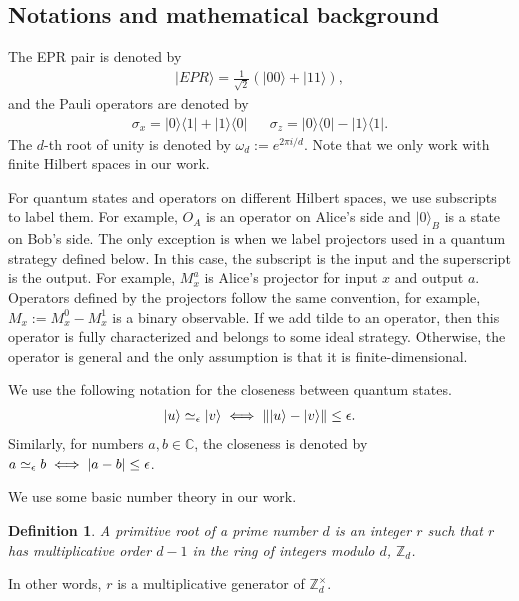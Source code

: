 \documentclass[11pt,letterpaper]{article}
\newcommand{\ket}[1]{|#1\rangle}
\newcommand{\ketbra}[2]{|#1\rangle\langle#2|}
\DeclarePairedDelimiter{\norm}{\lVert}{\rVert}
\DeclarePairedDelimiter{\cnorm}{\lvert}{\rvert}
\newcommand{\C}{\mathbb{C}}
\newcommand{\Z}{\mathbb{Z}}
\newcommand{\Zd}{\Z_d^{\times}}
\newcommand{\1}{\mathbb{1}}
\newcommand{\EPR}[1]{\Sigma^{(#1)}}
\newcommand{\paulix}{\sigma_x}
\newcommand{\pauliz}{\sigma_z}
\newcommand{\appd}[1]{\simeq_{#1}}
\newtheorem{definition}[theorem]{Definition}
\theoremstyle{definition}
\begin{document}
\subsection{Notations and mathematical background}


The EPR pair is denoted by 
\begin{align}
	\ket{EPR} = \frac{1}{\sqrt{2}}(\ket{00} + \ket{11}),
\end{align}
and the Pauli operators are denoted by
\begin{align}
	\paulix = \ketbra{0}{1}+\ketbra{1}{0} && \pauliz = \ketbra{0}{0} - \ketbra{1}{1}.
\end{align}
The $d$-th root of unity is denoted by $\omega_d:=e^{2\pi i/d}$. 
Note that we only work with finite Hilbert spaces in our work.

For quantum states and operators on different Hilbert spaces, we use subscripts to label them.
For example, $O_A$ is an operator on Alice's side and $\ket{0}_{B}$ is a state on Bob's side. 
The only exception is when we label projectors used in a quantum strategy defined below. In this case, the subscript 
is the input and the superscript is the output. For example, $M_x^a$ is Alice's projector for input $x$ and output $a$.
Operators defined by the projectors follow the same convention, for example, $M_x := M_x^0 - M_x^1$ is 
a binary observable.
If we add tilde to an operator, then this operator is fully characterized and belongs to some ideal strategy.
Otherwise, the operator is general and the only assumption is that it is finite-dimensional.

We use the following notation for the closeness between quantum states.
\begin{align}
	\ket{u} \appd{\epsilon} \ket{v} \iff \norm{\ket{u} - \ket{v}} \leq \epsilon. 
\end{align}
Similarly, for numbers $a,b \in \C$, the closeness is denoted by
$a \appd{\epsilon} b \iff \cnorm{a-b} \leq \epsilon$.

We use some basic number theory in our work. 
\begin{definition}
A primitive root of a prime number
$d$ is an integer $r$ such that $r$ has multiplicative order $d-1$
in the ring of integers modulo $d$, $\mathbb{Z}_d$.
\end{definition}
In other words,
$r$ is a multiplicative generator of $\Zd$. 
\end{document}
